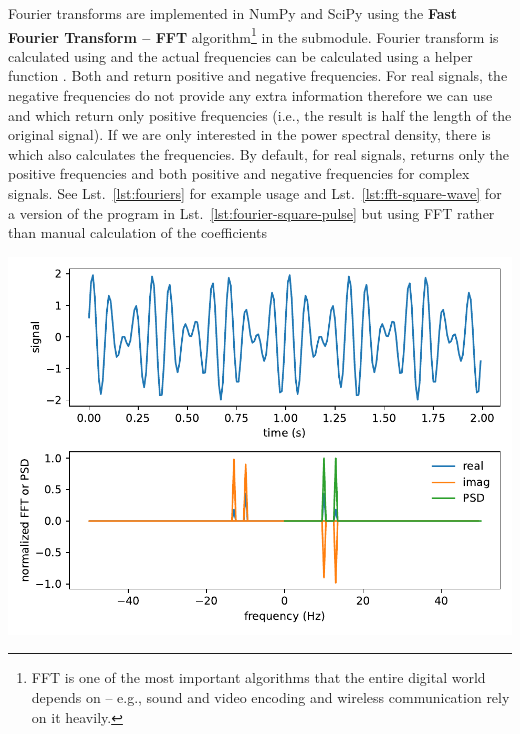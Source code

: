 Fourier transforms are implemented in NumPy and SciPy using the \textbf{Fast Fourier Transform -- FFT} algorithm\footnote{FFT is one of the most important algorithms that the entire digital world depends on -- e.g., sound and video encoding and wireless communication rely on it heavily.} in the  submodule. Fourier transform is calculated using  and the actual frequencies can be calculated using a helper function . Both  and  return positive and negative frequencies. For real signals, the negative frequencies do not provide any extra information therefore we can use  and  which return only positive frequencies (i.e., the result is half the length of the original signal). If we are only interested in the power spectral density, there is  which also calculates the frequencies. By default, for real signals,  returns only the positive frequencies and both positive and negative frequencies for complex signals. See Lst.~\ref{lst:fouriers} for example usage and Lst.~\ref{lst:fft-square-wave} for a version of the program in Lst.~\ref{lst:fourier-square-pulse} but using FFT rather than manual calculation of the coefficients


\begin{center}
    \includegraphics[width=0.5\linewidth]{fouriers.pdf}
\end{center}



